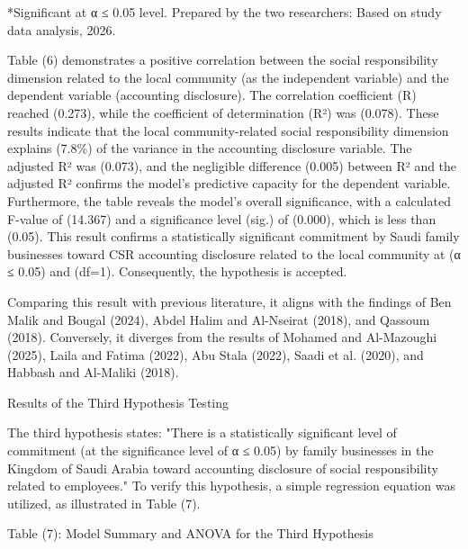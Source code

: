 \documentclass{default}
\begin{document}
*Significant at α ≤ 0.05 level. Prepared by the two researchers: Based on study data analysis, 2026.

Table (6) demonstrates a positive correlation between the social responsibility dimension related to the local community (as the independent variable) and the dependent variable (accounting disclosure). The correlation coefficient (R) reached (0.273), while the coefficient of determination (R²) was (0.078). These results indicate that the local community-related social responsibility dimension explains (7.8\%) of the variance in the accounting disclosure variable. The adjusted R² was (0.073), and the negligible difference (0.005) between R² and the adjusted R² confirms the model’s predictive capacity for the dependent variable. Furthermore, the table reveals the model's overall significance, with a calculated F-value of (14.367) and a significance level (sig.) of (0.000), which is less than (0.05). This result confirms a statistically significant commitment by Saudi family businesses toward CSR accounting disclosure related to the local community at (α ≤ 0.05) and (df=1). Consequently, the hypothesis is accepted.

Comparing this result with previous literature, it aligns with the findings of Ben Malik and Bougal (2024), Abdel Halim and Al-Nseirat (2018), and Qassoum (2018). Conversely, it diverges from the results of Mohamed and Al-Mazoughi (2025), Laila and Fatima (2022), Abu Stala (2022), Saadi et al. (2020), and Habbash and Al-Maliki (2018).

Results of the Third Hypothesis Testing

The third hypothesis states: "There is a statistically significant level of commitment (at the significance level of α ≤ 0.05) by family businesses in the Kingdom of Saudi Arabia toward accounting disclosure of social responsibility related to employees." To verify this hypothesis, a simple regression equation was utilized, as illustrated in Table (7).

Table (7): Model Summary and ANOVA for the Third Hypothesis

\begin{table}[htbp]
\centering
{}
\caption{}

\end{table}
\end{document}
